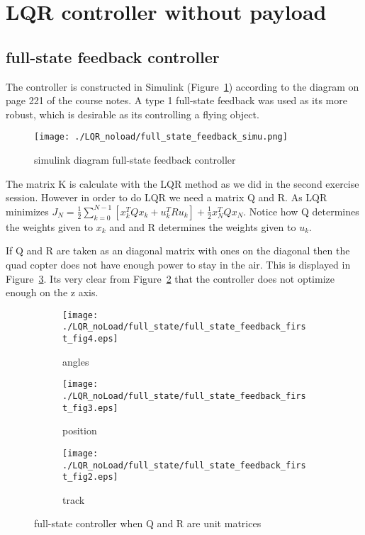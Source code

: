 \section{LQR controller without payload}
\subsection{full-state feedback controller}

The controller is constructed in Simulink (Figure~\ref{fig:simulink diagram full-state feedback controller}) according to the diagram on page 221 of the course notes. A type 1 full-state feedback was used as its more robust, which is desirable as its controlling a flying object. 

\begin{figure}[H]
	\centering
	\texttt{[image: ./LQR\_noload/full\_state\_feedback\_simu.png]}
	\caption{simulink diagram full-state feedback controller}
	\label{fig:simulink diagram full-state feedback controller}
\end{figure}

The matrix K is calculate with the LQR method as we did in the second exercise session. However in order to do LQR we need a matrix Q and R. As LQR minimizes $J_N = \frac{1}{2} \sum_{k=0}^{N-1}[x_k^TQx_k + u^T_kRu_k] + \frac{1}{2}x_N^TQx_N$. Notice how Q determines the weights given to $x_k$ and and R determines the weights given to $u_k$. 

If Q and R are taken as an diagonal matrix with ones on the diagonal then the quad copter does not have enough power to stay in the air. This is displayed in Figure~\ref{fig:full-state controller with simple diagonal matrices as Q and R}. Its very clear from Figure~\ref{fig:full-state controller with simple diagonal matrices as Q and R demo bad z position} that the controller does not optimize enough on the z axis.

\begin{figure}[H]
	\centering
	\begin{subfigure}[b]{0.3\textwidth}
		\texttt{[image: ./LQR\_noLoad/full\_state/full\_state\_feedback\_first\_fig4.eps]}
		\caption{angles}
	\end{subfigure}
	\begin{subfigure}[b]{0.3\textwidth}
		\texttt{[image: ./LQR\_noLoad/full\_state/full\_state\_feedback\_first\_fig3.eps]}
		\caption{position}
		\label{fig:full-state controller with simple diagonal matrices as Q and R demo bad z position}
	\end{subfigure}
	\begin{subfigure}[b]{0.3\textwidth}
		\texttt{[image: ./LQR\_noLoad/full\_state/full\_state\_feedback\_first\_fig2.eps]}
		\caption{track}
	\end{subfigure}
	\caption{full-state controller when Q and R are unit matrices}\label{fig:full-state controller with simple diagonal matrices as Q and R}
\end{figure}

